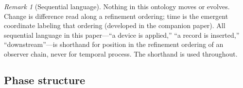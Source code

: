 \documentclass[11pt]{article}
\theoremstyle{definition}
\theoremstyle{remark}
\newtheorem{remark}{Remark}
\begin{document}
\begin{remark}[Sequential language]\label{rem:register}
Nothing in this ontology moves or evolves. Change is difference read along a refinement ordering; time is the emergent coordinate labeling that ordering (developed in the companion paper). All sequential language in this paper---``a device is applied,'' ``a record is inserted,'' ``downstream''---is shorthand for position in the refinement ordering of an observer chain, never for temporal process. The shorthand is used throughout.
\end{remark}

\subsection{Phase structure}\label{sec:phase}
\end{document}
